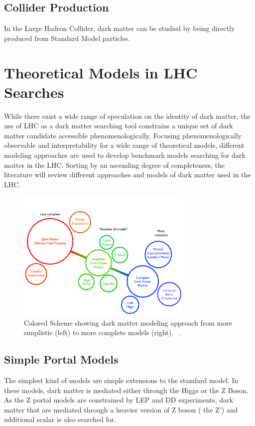 \subsection{Collider Production} 
    In the Large Hadron Collider, dark matter can be studied by being directly produced from Standard Model particles.

\section{Theoretical Models in LHC Searches}
\label{section:models}

While there exist a wide range of speculation on the identity of dark matter, the use of LHC as a dark matter searching tool constrains a unique set of dark matter candidate accessible phenomenologically. 
Focusing phenomenologically observable and interpretability for a wide range of theoretical models, different modeling approaches are used to develop benchmark models searching for dark matter in the LHC.
Sorting by an ascending degree of completeness, the literature will review different approaches and models of dark matter used in the LHC.


\begin{figure}[!htb]
    \begin{center}
        \includegraphics[width=0.75\textwidth]{figures/chapter_DM/Model}
        \caption{
			Colored Scheme showing dark matter modeling approach from more simplistic (left) to more complete models (right).  ~\cite{Abdallah:2024101}.
        }
        \label{fig:Model_figure}
    \end{center}
\end{figure}



\subsection{Simple Portal Models}
The simplest kind of models are simple extensions to the standard model. In these models, dark matter is mediated either through the Higgs or the Z Boson. As the Z portal models are constrained by LEP and DD experiments, dark matter that are mediated through a heavier version of Z boson ( the Z') and additional scalar is also searched for. 

